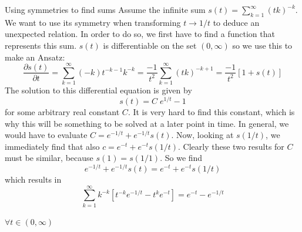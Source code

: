 \documentclass[11pt, xcolor=dvipsnames]{beamer}
\begin{document}
\begin{frame}{Using symmetries to find sums}
Assume the infinite sum $s(t) = \sum_{k=1}^{\infty} (tk)^{-k}$. We want to use its symmetry when transforming $t\rightarrow 1/t$ to deduce an unexpected relation. In order to do so, we first have to find a function that represents this sum. $s(t)$ is differentiable on the set $(0, \infty )$ so we use this to make an Ansatz:
\begin{equation}
\frac{\partial s(t)}{\partial t} = \sum_{k=1}^{\infty}(-k) t^{-k-1}  k^{-k} = \frac{-1}{t^2} \sum_{k=1}^{\infty} (tk)^{-k+1} = \frac{-1}{t^2}\left[ 1+s(t)\right]
\end{equation}
The solution to this differential equation is given by
\begin{equation}
    s(t) = C\;e^{1/t} - 1
\end{equation}
for some arbitrary real constant $C$. It is very hard to find this constant, which is why this will be something to be solved at a later point in time. In general, we would have to evaluate $C = e^{-1/t} + e^{-1/t} s(t)$.
Now, looking at $s(1/t)$, we immediately find that also $c = e^{-t} + e^{-t} s(1/t)$. Clearly these two results for $C$ must be similar, because $s(1) = s(1/1)$. So we find
\begin{equation}
    e^{-1/t} + e^{-1/t} s(t) = e^{-t} + e^{-t} s(1/t)
\end{equation}
which results in
\\
\begin{equation}
    \sum_{k=1}^{\infty} k^{-k} \left[ t^{-k}e^{-1/t} - t^ke^{-t}\right] = e^{-t} - e^{-1/t}
\end{equation}
\\
    $\forall t\in (0,\infty )$
    
\end{frame}
\end{document}
